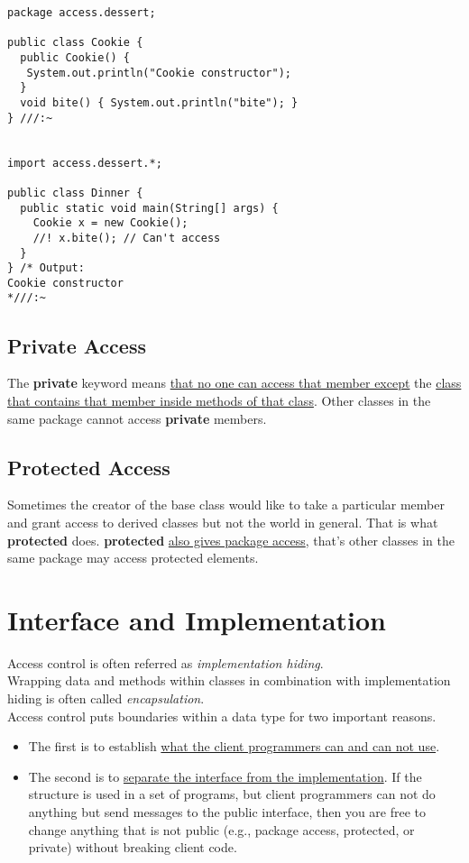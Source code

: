 \documentclass[10pt,letterpaper]{report}
\begin{document}
\begin{lstlisting}
package access.dessert;

public class Cookie {
  public Cookie() {
   System.out.println("Cookie constructor");
  }
  void bite() { System.out.println("bite"); }
} ///:~


import access.dessert.*;

public class Dinner {
  public static void main(String[] args) {
    Cookie x = new Cookie();
    //! x.bite(); // Can't access
  }
} /* Output:
Cookie constructor
*///:~
\end{lstlisting}
\subsection{Private Access}
The \textbf{private} keyword means \underline{that no one can access that member except} the \underline{class that contains that member inside methods of that class}. Other classes in the same package cannot access \textbf{private} members.

\subsection{Protected Access}
Sometimes the creator of the base class would like to take a particular member and grant access to derived classes but not the world in general. That is what \textbf{protected} does. \textbf{protected} \underline{also gives package access}, that's other classes in the same package may access protected elements.

\section{Interface and Implementation}
Access control is often referred as \textit{implementation hiding}.\\
Wrapping data and methods within classes in combination with implementation hiding is often called \textit{encapsulation}.\\
Access control puts boundaries within a data type for two important reasons.
\begin{itemize}
\item The first is to establish \underline{what the client programmers can and can not use}.
\item The second is to \underline{separate the interface from the implementation}. If the structure is used in a set of programs, but client programmers can not do anything but send messages to the public interface, then you are free to change anything that is not public (e.g., package access, protected, or private) without breaking client code.
\end{itemize}
\end{document}
